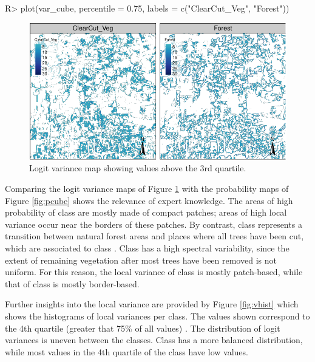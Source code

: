 \documentclass[
]{jss}
\begin{document}
\begin{CodeChunk}
\begin{CodeInput}
R> plot(var_cube, percentile = 0.75, labels = c("ClearCut_Veg", "Forest"))
\end{CodeInput}
\begin{figure}[h]

{\centering \includegraphics{Bayesian_smoothing_JSS_files/figure-latex/vcube-1} 

}

\caption[Logit variance map showing values above the 3rd quartile]{Logit variance map showing values above the 3rd quartile.}\label{fig:vcube}
\end{figure}
\end{CodeChunk}

Comparing the logit variance maps of Figure \ref{fig:vcube} with the probability maps of Figure \ref{fig:pcube} shows the relevance of expert knowledge. The areas of high probability of class  are mostly made of compact patches; areas of high local variance occur near the borders of these patches. By contrast, class  represents a transition between natural forest areas and places where all trees have been cut, which are associated to class . Class  has a high spectral variability, since the extent of remaining vegetation after most trees have been removed is not uniform. For this reason, the local variance of class  is mostly patch-based, while that of class  is mostly border-based.

Further insights into the local variance are provided by Figure \ref{fig:vhist} which shows the histograms of local variances per class. The values shown correspond to the 4th quartile (greater that 75\% of all values) . The distribution of logit variances is uneven between the classes. Class  has a more balanced distribution, while most values in the 4th quartile of the  class have low values.
\end{document}
